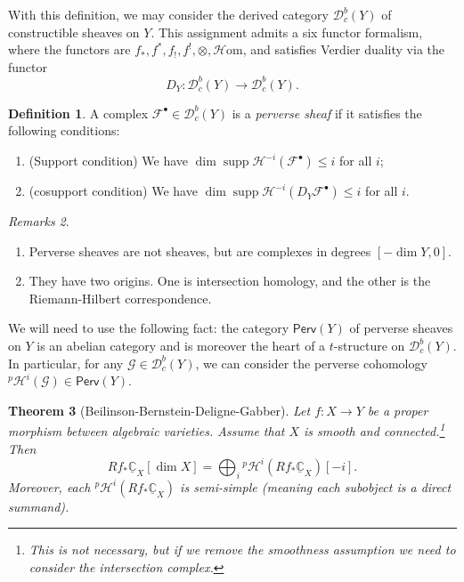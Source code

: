 \documentclass{amsart}
\newtheorem{thm}{Theorem}[section]
\theoremstyle{definition}
\newtheorem{defn}[thm]{Definition}
\theoremstyle{remark}
\newtheorem{rmks}[thm]{Remarks}
\theoremstyle{plain}
\theoremstyle{definition}
\theoremstyle{remark}
\newcommand{\C}{\mathbb{C}}
\newcommand{\mc}[1]{\mathcal{#1}}
\newcommand{\mr}[1]{\mathrm{#1}}
\newcommand{\on}[1]{\operatorname{#1}}
\newcommand{\ms}[1]{\mathsf{#1}}
\newcommand{\ul}[1]{\underline{#1}}
\newcommand{\1}{\mathbf{1}}
\newcommand{\2}{\mathbf{2}}
\newcommand{\3}{\mathbf{3}}
\begin{document}
With this definition, we may consider the derived category \(\mc{D}_c^b(Y)\) of constructible sheaves on \(Y\). This assignment admits a six functor formalism, where the functors are \(f_*, f^*, f_!, f^!, \otimes, \mc{H}\mr{om}\), and satisfies Verdier duality via the functor
\[ D_Y \colon \mc{D}_c^b(Y) \to \mc{D}_c^b(Y). \]

\begin{defn}
    A complex \(\mc{F}^{\bullet} \in \mc{D}_c^b(Y)\) is a \textit{perverse sheaf} if it satisfies the following conditions:
    \begin{enumerate}
        \item (Support condition) We have \(\dim \on{supp} \mc{H}^{-i}(\mc{F}^{\bullet}) \leq i\) for all \(i\);
        \item (cosupport condition) We have \(\dim \on{supp} \mc{H}^{-i}(D_Y \mc{F}^{\bullet}) \leq i\) for all \(i\).
    \end{enumerate}
\end{defn}

\begin{rmks}\leavevmode
    \begin{enumerate}
        \item Perverse sheaves are not sheaves, but are complexes in degrees \([-\dim Y, 0]\).
        \item They have two origins. One is intersection homology, and the other is the Riemann-Hilbert correspondence.
    \end{enumerate}
\end{rmks}

We will need to use the following fact: the category \(\ms{Perv}(Y)\) of perverse sheaves on \(Y\) is an abelian category and is moreover the heart of a \(t\)-structure on \(\mc{D}_c^b(Y)\). In particular, for any \(\mc{G} \in \mc{D}_c^b (Y)\), we can consider the perverse cohomology \(^p\mc{H}^i(\mc{G}) \in \ms{Perv}(Y)\).

\begin{thm}[Beilinson-Bernstein-Deligne-Gabber]
    Let \(f \colon X \to Y\) be a proper morphism between algebraic varieties. Assume that \(X\) is smooth and connected.\footnote{This is not necessary, but if we remove the smoothness assumption we need to consider the intersection complex.} Then
    \[ R f_* \ul{\C}_X [\dim X] = \bigoplus_{i} {^p\mc{H}^i}(R f_* \ul{\C}_X)[-i]. \]
    Moreover, each \(^p\mc{H}^i (R f_* \ul{\C}_X)\) is semi-simple (meaning each subobject is a direct summand).
\end{thm}
\end{document}
